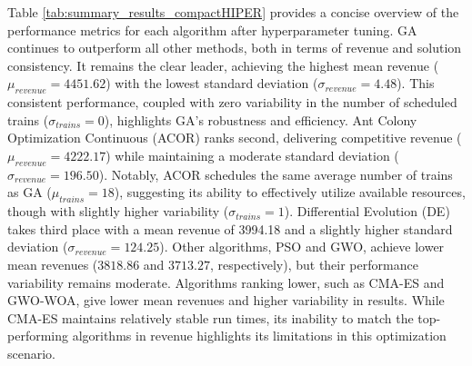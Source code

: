 \documentclass[Afour,sagev,times]{sagej}
\begin{document}
Table \ref{tab:summary_results_compactHIPER} provides a concise overview of the performance metrics for each algorithm after hyperparameter tuning. \gls{GA} continues to outperform all other methods, both in terms of revenue and solution consistency. It remains the clear leader, achieving the highest mean revenue (\(\mu_{revenue} = 4451.62\)) with the lowest standard deviation (\(\sigma_{revenue} = 4.48\)). This consistent performance, coupled with zero variability in the number of scheduled trains (\(\sigma_{trains} = 0\)), highlights \gls{GA}’s robustness and efficiency. Ant Colony Optimization Continuous (\gls{ACOR}) ranks second, delivering competitive revenue (\(\mu_{revenue} = 4222.17\)) while maintaining a moderate standard deviation (\(\sigma_{revenue} = 196.50\)). Notably, \gls{ACOR} schedules the same average number of trains as \gls{GA} (\(\mu_{trains} = 18\)), suggesting its ability to effectively utilize available resources, though with slightly higher variability (\(\sigma_{trains} = 1\)). Differential Evolution (\gls{DE}) takes third place with a mean revenue of 3994.18 and a slightly higher standard deviation (\(\sigma_{revenue} = 124.25\)). Other algorithms, \gls{PSO} and \gls{GWO}, achieve lower mean revenues (\(3818.86\) and \(3713.27\), respectively), but their performance variability remains moderate. Algorithms ranking lower, such as \gls{CMA-ES} and \gls{GWO-WOA}, give lower mean revenues and higher variability in results. While \gls{CMA-ES} maintains relatively stable run times, its inability to match the top-performing algorithms in revenue highlights its limitations in this optimization scenario.
\end{document}
